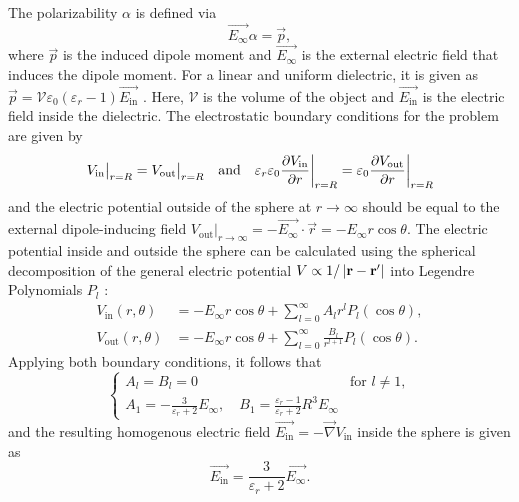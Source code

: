 The polarizability $\alpha$ is defined via
\begin{equation}
  \vec{E_\infty} \alpha = \vec{p},
\end{equation}
where $\vec{p}$ is the induced dipole moment and $\vec{E_\infty}$ is the external electric field that induces the dipole moment. For a linear and uniform dielectric, it is given as $\vec{p} = \mathcal{V} \varepsilon_0 (\varepsilon_r - 1) \vec{E_\mathrm{in}}$ \cite[p. 220-226]{Griffiths_2018}. Here, $\mathcal{V}$ is the volume of the object and $\vec{E_\mathrm{in}}$ is the electric field inside the dielectric.
The electrostatic boundary conditions for the problem are given by
\begin{equation}
  V_\mathrm{in} \big|_{r=R} = V_\mathrm{out} \big|_{r=R} 
  \quad \text{and} \quad 
  \varepsilon_r\varepsilon_0\pdv{V_\mathrm{in}}{r}\bigg|_{r=R} = \varepsilon_0\pdv{V_\mathrm{out}}{r} \bigg|_{r=R}
\end{equation}
and the electric potential outside of the sphere at $r\rightarrow\infty$ should be equal to the external dipole-inducing field $V_\mathrm{out} |_{r\rightarrow\infty} = -\vec{E_\infty} \cdot \vec{r} = -E_\infty r\cos\theta$.
The electric potential inside and outside the sphere can be calculated using the spherical decomposition of the general electric potential $V \propto 1/\abs{\vec{r} - \vec{r'}}$ into Legendre Polynomials $P_l$ \cite[p. 188-190]{Griffiths_2018}:
\begin{align}
  V_\mathrm{in}(r, \theta) &= -E_\infty r\cos\theta + \sum_{l=0}^{\infty} A_l r^l P_l(\cos\theta), \\
  V_\mathrm{out}(r, \theta) &= -E_\infty r \cos\theta + \sum_{l=0}^{\infty} \frac{B_l}{r^{l+1}} P_l(\cos\theta).
\end{align}
Applying both boundary conditions, it follows that \cite[p. 249-251]{Griffiths_2018}
\begin{equation}
  \begin{cases}
    A_l = B_l = 0 & \text{for } l \neq 1, \\
  A_1 = -\frac{3}{\varepsilon_r + 2}E_\infty, \quad B_1 = \frac{\varepsilon_r-1}{\varepsilon_r + 2}R^3E_\infty
  \end{cases}
\end{equation}
and the resulting  homogenous electric field $\vec{E_\mathrm{in}} = -\vec{\nabla} V_\mathrm{in}$ inside the sphere is given as
\begin{equation}
  \vec{E_\mathrm{in}} = \frac{3}{\varepsilon_r + 2} \vec{E_\infty} .
\end{equation}
